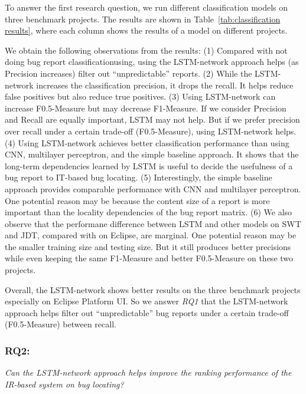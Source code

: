 To answer the first research question, we run different classification models on three benchmark projects. The results are shown in Table~\ref{tab:classification results}, where each column shows the results of a model on different projects.

We obtain the following observations from the results: (1) Compared with not doing bug report classificationusing, using the LSTM-network approach helps (as Precision increases) filter out ``unpredictable'' reports. (2) While the LSTM-network increases the classification precision, it drops the recall. It helps reduce false positives but also reduce true positives. (3) Using LSTM-network can increase F0.5-Measure but may decrease F1-Measure. If we consider Precision and Recall are equally important, LSTM may not help. But if we prefer precision over recall under a certain trade-off (F0.5-Measure), using LSTM-network helps. (4) Using LSTM-network achieves better classification performance than using CNN, multilayer perceptron, and the simple baseline approach. It shows that the long-term dependencies learned by LSTM is useful to decide the usefulness of a bug report to IT-based bug locating. (5) Interestingly, the simple baseline approach provides comparable performance with CNN and multilayer perceptron. One potential reason may be because the content size of a report is more important than the locality dependencies of the bug report matrix. (6) We also observe that the performane difference between LSTM and other models on SWT and JDT, compared with on Eclipse, are marginal. One potential reason may be the smaller training size and testing size. But it still produces better precisions while even keeping the same F1-Measure and better F0.5-Measure on these two projects.

Overall, the LSTM-network shows better results on the three benchmark projects especially on Eclipse Platform UI. So we answer \textit{RQ1} that the LSTM-network approach helps filter out ``unpredictable'' bug reports under a certain trade-off (F0.5-Measure) between recall.

\subsubsection{\textbf{RQ2:}}
\label{sec:research question 2}
\textit{Can the LSTM-network approach helps improve the ranking performance of the IR-based system on bug locating?}

